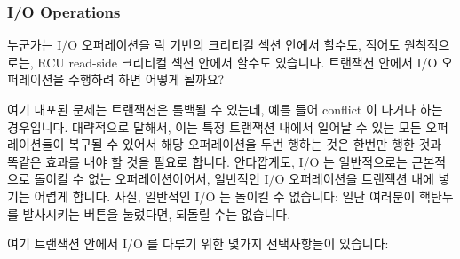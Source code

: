\subsubsection{I/O Operations}
\label{sec:future:I/O Operations}

누군가는 I/O 오퍼레이션을 락 기반의 크리티컬 섹션 안에서 할수도, 적어도
원칙적으로는, RCU read-side 크리티컬 섹션 안에서 할수도 있습니다.
트랜잭션 안에서 I/O 오퍼레이션을 수행하려 하면 어떻게 될까요?

여기 내포된 문제는 트랜잭션은 롤백될 수 있는데, 예를 들어 conflict 이 나거나
하는 경우입니다.
대략적으로 말해서, 이는 특정 트랜잭션 내에서 일어날 수 있는 모든 오퍼레이션들이
복구될 수 있어서 해당 오퍼레이션을 두번 행하는 것은 한번만 행한 것과 똑같은
효과를 내야 할 것을 필요로 합니다.
안타깝게도, I/O 는 일반적으로는 근본적으로 돌이킬 수 없는 오퍼레이션이어서,
일반적인 I/O 오퍼레이션을 트랜잭션 내에 넣기는 어렵게 합니다.
사실, 일반적인 I/O 는 돌이킬 수 없습니다:
일단 여러분이 핵탄두를 발사시키는 버튼을 눌렀다면, 되돌릴 수는 없습니다.

여기 트랜잭션 안에서 I/O 를 다루기 위한 몇가지 선택사항들이 있습니다:

